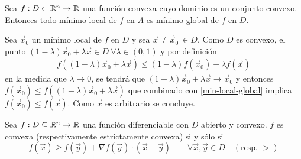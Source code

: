 \begin{teorema}\label{teoconvexidad2}
Sea $f: D \subset \mathbb{R}^n \to \mathbb{R}$ una funci\'on convexa cuyo dominio es un conjunto convexo. Entonces todo m\'inimo local de $f$ en $A$ es m\'inimo global de $f$ en $D$.
\end{teorema}

\begin{demostracion}
Sea $\vec{x}_0$ un m\'inimo local de $f$ en $D$ y sea $\vec{x}\neq \vec{x}_0 \:\in D$. Como $D$ es convexo, el punto $(1-\lambda)\vec{x}_0+ \lambda \vec{x} \in D \:\forall \lambda \in (0,1)$ y por definici\'on
\begin{gather}\label{min-local-global}
f((1-\lambda)\vec{x}_0+ \lambda \vec{x}) \leq (1-\lambda)f(\vec{x}_0)+ \lambda f(\vec{x}) \tag{*}
\end{gather}
en la medida que $\lambda \to 0$, se tendr\'a que $(1-\lambda)\vec{x}_0+ \lambda \vec{x} \to \vec{x}_0$ y entonces $f(\vec{x}_0) \leq f((1-\lambda)\vec{x}_0+ \lambda \vec{x})$ que combinado con \eqref{min-local-global} implica $f(\vec{x}_0) \leq f(\vec{x})$. Como $\vec{x}$ es arbitrario se concluye.
\end{demostracion}

\begin{teorema}\label{teoconvexidad3}
Sea $f: D\subseteq \mathbb{R}^n \to \mathbb{R}$ una funci\'on diferenciable con $D$ abierto y convexo. $f$ es convexa (respectivamente estrictamente convexa) si y s\'olo si
\begin{equation}\label{tc2eq1}
f(\vec{x})\geq f(\vec{y})+\nabla f(\vec{y})\cdot(\vec{x}-\vec{y}) \qquad \forall \vec{x},\vec{y} \in D \quad (\text{resp. }>)
\end{equation}
\end{teorema}


